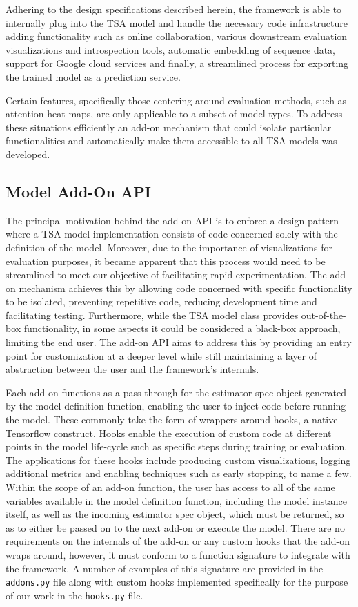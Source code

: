 \documentclass[../../fyp.tex]{subfiles}
\begin{document}
Adhering to the design specifications described herein, the framework is able to internally plug into the TSA model and handle the necessary code infrastructure adding functionality such as online collaboration, various downstream evaluation visualizations and introspection tools, automatic embedding of sequence data, support for Google cloud services and finally, a streamlined process for exporting the trained model as a prediction service. 

Certain features, specifically those centering around evaluation methods, such as attention heat-maps, are only applicable to a subset of model types. To address these situations efficiently an add-on mechanism that could isolate particular functionalities and automatically make them accessible to all TSA models was developed. 

\subsection{Model Add-On API}
The principal motivation behind the add-on API is to enforce a design pattern where a TSA model implementation consists of code concerned solely with the definition of the model. Moreover, due to the importance of visualizations for evaluation purposes, it became apparent that this process would need to be streamlined to meet our objective of facilitating rapid experimentation. The add-on mechanism achieves this by allowing code concerned with specific functionality to be isolated, preventing repetitive code, reducing development time and facilitating testing. Furthermore, while the TSA model class provides out-of-the-box functionality, in some aspects it could be considered a black-box approach, limiting the end user. The add-on API aims to address this by providing an entry point for customization at a deeper level while still maintaining a layer of abstraction between the user and the framework's internals.

Each add-on functions as a pass-through for the estimator spec object generated by the model definition function, enabling the user to inject code before running the model. These commonly take the form of wrappers around hooks, a native Tensorflow construct. Hooks enable the execution of custom code at different points in the model life-cycle such as specific steps during training or evaluation. The applications for these hooks include producing custom visualizations, logging additional metrics and enabling techniques such as early stopping, to name a few. Within the scope of an add-on function, the user has access to all of the same variables available in the model definition function, including the model instance itself, as well as the incoming estimator spec object, which must be returned, so as to either be passed on to the next add-on or execute the model. There are no requirements on the internals of the add-on or any custom hooks that the add-on wraps around, however, it must conform to a function signature to integrate with the framework. A number of examples of this signature are provided in the \texttt{addons.py} file along with custom hooks implemented specifically for the purpose of our work in the \texttt{hooks.py} file.  
\end{document}
